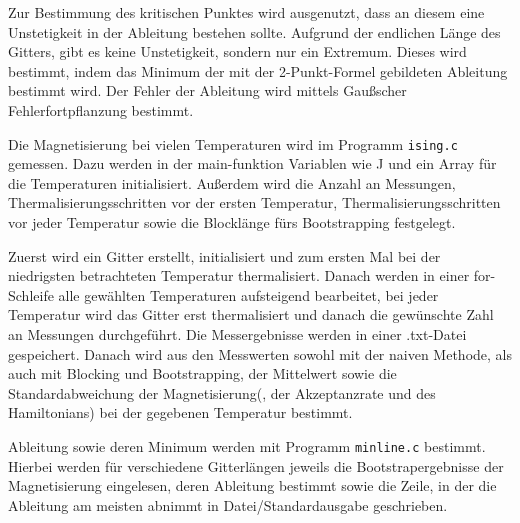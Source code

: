 	Zur Bestimmung des kritischen Punktes wird ausgenutzt, dass an diesem eine Unstetigkeit in der Ableitung bestehen sollte. Aufgrund der endlichen Länge des Gitters, gibt es keine Unstetigkeit, sondern nur ein Extremum. Dieses wird bestimmt, indem das Minimum der mit der 2-Punkt-Formel gebildeten Ableitung bestimmt wird. Der Fehler der Ableitung wird mittels Gaußscher Fehlerfortpflanzung bestimmt.
		
	Die Magnetisierung bei vielen Temperaturen wird im Programm \texttt{ising.c} gemessen. Dazu werden in der main-funktion Variablen wie J und ein Array für die Temperaturen initialisiert. Außerdem wird die Anzahl an Messungen, Thermalisierungsschritten vor der ersten Temperatur, Thermalisierungsschritten vor jeder Temperatur sowie die Blocklänge fürs Bootstrapping festgelegt. 	
	
	Zuerst wird ein Gitter erstellt, initialisiert und zum ersten Mal bei der niedrigsten betrachteten Temperatur thermalisiert. Danach werden in einer for-Schleife alle gewählten Temperaturen aufsteigend bearbeitet, bei jeder Temperatur wird das Gitter erst thermalisiert und danach die gewünschte Zahl an Messungen durchgeführt.
	Die Messergebnisse werden in einer .txt-Datei gespeichert. Danach wird aus den Messwerten sowohl mit der naiven Methode, als auch mit Blocking und Bootstrapping, der Mittelwert sowie die Standardabweichung der Magnetisierung(, der Akzeptanzrate und des Hamiltonians) bei der gegebenen Temperatur bestimmt.
	
	Ableitung sowie deren Minimum werden mit Programm \texttt{minline.c} bestimmt. Hierbei werden für verschiedene Gitterlängen jeweils die Bootstrapergebnisse der Magnetisierung eingelesen, deren Ableitung bestimmt sowie die Zeile, in der die Ableitung am meisten abnimmt in Datei/Standardausgabe geschrieben.
		
